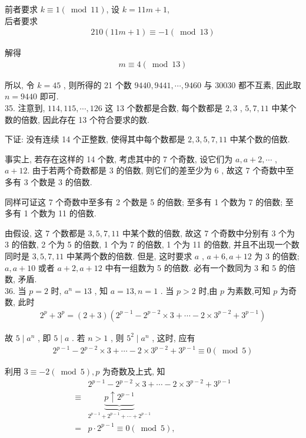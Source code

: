 前者要求 $k \equiv 1(\bmod 11)$, 设 $k=11 m+1$,\\
后者要求
\begin{align*}
	210(11 m+1) \equiv-1(\bmod 13)
\end{align*}

解得
\begin{align*}
	m \equiv 4(\bmod 13)
\end{align*}

所以, 令 $k=45$ , 则所得的 21 个数 $9440,9441, \cdots, 9460$ 与 30030 都不互素, 因此取 $n=9440$ 即可. \\
35. 注意到,  $114,115, \cdots, 126$ 这 13 个数都是合数, 每个数都是 $2 ,  3$ ,  $5 ,  7 ,  11$ 中某个数的倍数, 因此存在 13 个符合要求的数.

下证: 没有连续 14 个正整数, 使得其中每个数都是 $2 ,  3 ,  5 ,  7 ,  11$ 中某个数的倍数.

事实上, 若存在这样的 14 个数, 考虑其中的 7 个奇数, 设它们为 $a ,  a+2, \cdots$ ,  $a+12$. 由于若两个奇数都是 3 的倍数, 则它们的差至少为 6 , 故这 7 个奇数中至多有 3 个数是 3 的倍数.

同样可证这 7 个奇数中至多有 2 个数是 5 的倍数; 至多有 1 个数为 7 的倍数; 至多有 1 个数为 11 的倍数.

由假设, 这 7 个数都是 $3 ,  5 ,  7 ,  11$ 中某个数的倍数, 故这 7 个奇数中分别有 3 个为 3 的倍数,  2 个为 5 的倍数,  1 个为 7 的倍数,  1 个为 11 的倍数, 并且不出现一个数同时是 $3 ,  5 ,  7 ,  11$ 中某两个数的倍数. 但是, 这时要求 $a$ ,  $a+6 ,  a+12$ 为 3 的倍数;  $a ,  a+10$ 或者 $a+2 ,  a+12$ 中有一组数为 5 的倍数. 必有一个数同为 3 和 5 的倍数, 矛盾. \\
36. 当 $p=2$ 时, $a^{n}=13$ , 知 $a=13, n=1$ . 当 $p>2$ 时,由 $p$ 为素数,可知 $p$ 为奇数, 此时
\begin{align*}
	2^{p}+3^{p}=(2+3)\left(2^{p-1}-2^{p-2} \times 3+\cdots-2 \times 3^{p-2}+3^{p-1}\right)
\end{align*}

故 $5 \mid a^{n}$ , 即 $5 \mid a$ . 若 $n>1$ , 则 $5^{2} \mid a^{n}$ , 这时, 应有
\begin{align*}
	2^{p-1}-2^{p-2} \times 3+\cdots-2 \times 3^{p-2}+3^{p-1} \equiv 0(\bmod 5)
\end{align*}

利用 $3 \equiv-2(\bmod 5), p$ 为奇数及上式, 知\begin{align}
	       & 2^{p-1}-2^{p-2} \times 3+\cdots-2 \times 3^{p-2}+3^{p-1}                      \\
	\equiv & \underbrace{\underbrace{p \uparrow 2^{p-1}}}_{2^{p-1}+2^{p-1}+\cdots+2^{p-1}} \\
	=      & p \cdot 2^{p-1} \equiv 0(\bmod 5),
\end{align}

